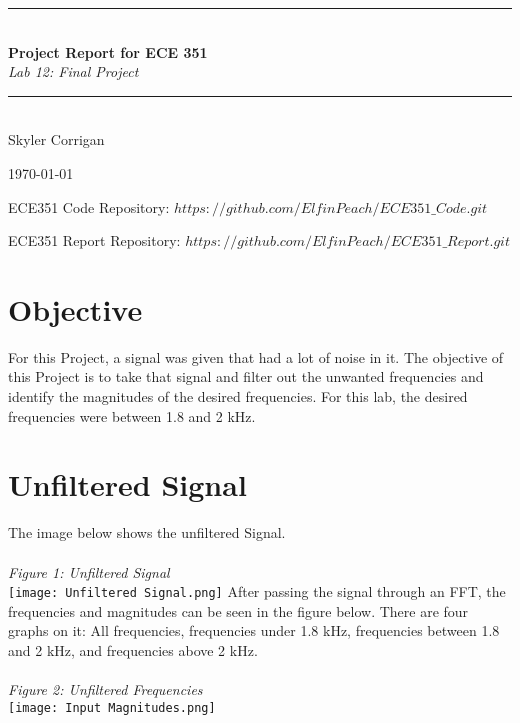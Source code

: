 \documentclass[12pt,a4paper]{article}
\newcommand{\HRule}{\rule{\linewidth}{0.5mm}}
\begin{document}
\begin{titlepage}
\begin{center}

\HRule \\[0.4cm]
{ \LARGE 
  \textbf{Project Report for ECE 351}\\[0.4cm]
  \emph{Lab 12: Final Project}\\[0.4cm]
}
\HRule \\[1.5cm]


{ \large
  Skyler Corrigan \\[0.1cm]
}

\vfill

{\large \today}

{ \large
ECE351 Code Repository: 
\hyperlink{$https://github.com/ElfinPeach/ECE351\_Code.git$}{$https://github.com/ElfinPeach/ECE351\_Code.git$}

ECE351 Report Repository: 
\hyperlink{$https://github.com/ElfinPeach/ECE351\_Report.git$}{$https://github.com/ElfinPeach/ECE351\_Report.git$}
}
 
\end{center}
\end{titlepage}

\newpage

\tableofcontents
{}
\newpage
\setcounter{page}{1}

\section{Objective}
For this Project, a signal was given that had a lot of noise in it. The objective of this Project is to take that signal and filter out the unwanted frequencies and identify the magnitudes of the desired frequencies. For this lab, the desired frequencies were between 1.8 and 2 kHz.
\section{Unfiltered Signal}
The image below shows the unfiltered Signal.\\
\\
\textit{Figure 1: Unfiltered Signal}
\\
\texttt{[image: Unfiltered Signal.png]}
\newpage
After passing the signal through an FFT, the frequencies and magnitudes can be seen in the figure below. There are four graphs on it: All frequencies, frequencies under 1.8 kHz, frequencies between 1.8 and 2 kHz, and frequencies above 2 kHz.\\
\\
\textit{Figure 2: Unfiltered Frequencies}
\\
\texttt{[image: Input Magnitudes.png]}
\\
\end{document}
